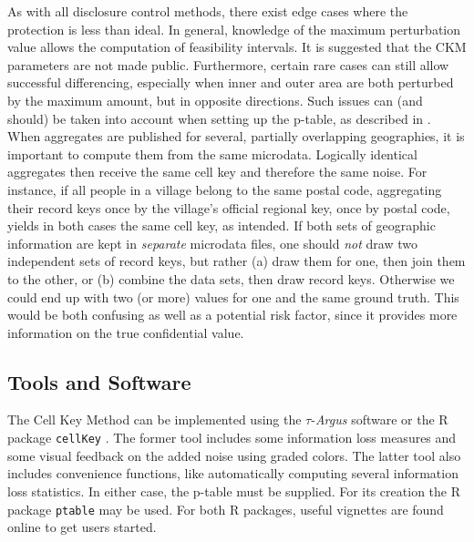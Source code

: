 As with all disclosure control methods, there exist edge cases where the protection is less than ideal. In general, knowledge of the maximum perturbation value allows the computation of feasibility intervals. It is suggested that the CKM parameters are not made public. Furthermore, certain rare cases can still allow successful differencing, especially when inner and outer area are both perturbed by the maximum amount, but in opposite directions. Such issues can (and should) be taken into account when setting up the p-table, as described in \cite{EnderleEtAl2020}.\\

When aggregates are published for several, partially overlapping geographies, it is important to compute them from the same microdata. Logically identical aggregates then receive the same cell key and therefore the same noise. For instance, if all people in a village belong to the same postal code, aggregating their record keys once by the village's official regional key, once by postal code, yields in both cases the same cell key, as intended. If both sets  of geographic information are kept in \emph{separate} microdata files, one should \emph{not} draw two independent sets of record keys, but rather (a) draw them for one, then join them to the other, or (b) combine the data sets, then draw record keys. Otherwise we could end up with two (or more) values for one and the same ground truth. 
This would be both confusing as well as a potential risk factor, since it provides more information on the true confidential value.

\subsection{Tools and Software}

The Cell Key Method can be implemented using the $\tau$-\emph{Argus} software \citep{QuickRefTau42x} or the R package \texttt{cellKey} \citep{cellkey_meindl}. The former tool includes some information loss measures and some visual feedback on the added noise using graded colors. The latter tool also includes convenience functions, like automatically computing several information loss statistics.
In either case, the p-table must be supplied. For its creation the R package \texttt{ptable} may be used. For both R packages, useful vignettes are found online to get users started.\bigskip


